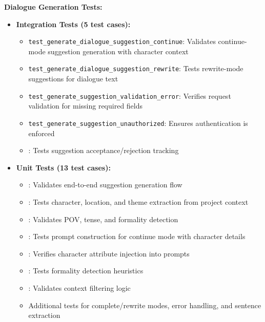 \textbf{Dialogue Generation Tests:}

\begin{itemize}
    \item \textbf{Integration Tests (5 test cases):}
    \begin{itemize}
        \item \texttt{test\_generate\_dialogue\_suggestion\_continue}: Validates continue-mode suggestion generation with character context
        \item \texttt{test\_generate\_dialogue\_suggestion\_rewrite}: Tests rewrite-mode suggestions for dialogue text
        \item \texttt{test\_generate\_suggestion\_validation\_error}: Verifies request validation for missing required fields
        \item \texttt{test\_generate\_suggestion\_unauthorized}: Ensures authentication is enforced
        \item \texttt{}: Tests suggestion acceptance/rejection tracking
    \end{itemize}
    \item \textbf{Unit Tests (13 test cases):}
    \begin{itemize}
        \item \texttt{}: Validates end-to-end suggestion generation flow
        \item \texttt{}: Tests character, location, and theme extraction from project context
        \item \texttt{}: Validates POV, tense, and formality detection
        \item \texttt{}: Tests prompt construction for continue mode with character details
        \item \texttt{}: Verifies character attribute injection into prompts
        \item \texttt{}: Tests formality detection heuristics
        \item \texttt{}: Validates context filtering logic
        \item Additional tests for complete/rewrite modes, error handling, and sentence extraction
    \end{itemize}
\end{itemize}

